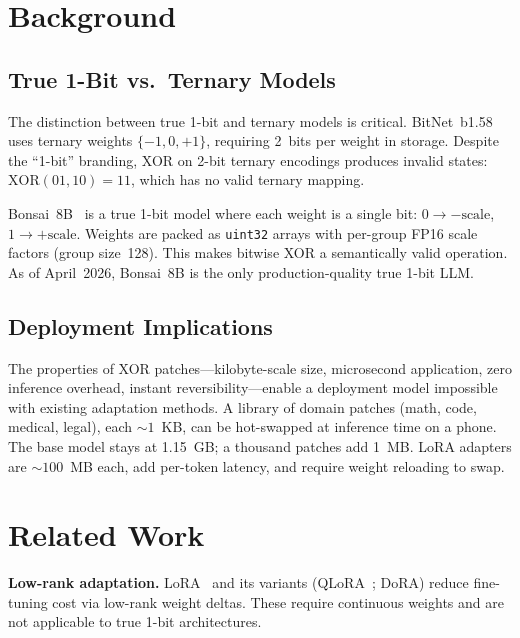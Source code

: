 \documentclass[11pt,a4paper]{article}
\begin{document}
\section{Background}

\subsection{True 1-Bit vs.\ Ternary Models}

The distinction between true 1-bit and ternary models is critical.
BitNet~b1.58~\citep{wang2023bitnet,ma2025bitnet} uses ternary weights
$\{-1, 0, +1\}$, requiring 2~bits per weight in storage. Despite the
``1-bit'' branding, XOR on 2-bit ternary encodings produces invalid
states: $\text{XOR}(01, 10) = 11$, which has no valid ternary mapping.

Bonsai~8B~\citep{prismml2026} is a true 1-bit model where each weight
is a single bit: $0 \to -\text{scale}$, $1 \to +\text{scale}$. Weights
are packed as \texttt{uint32} arrays with per-group FP16 scale factors
(group size~128). This makes bitwise XOR a semantically valid operation.
As of April~2026, Bonsai~8B is the only production-quality true 1-bit LLM.

\subsection{Deployment Implications}

The properties of XOR patches---kilobyte-scale size, microsecond
application, zero inference overhead, instant reversibility---enable
a deployment model impossible with existing adaptation methods.
A library of domain patches (math, code, medical, legal), each
${\sim}1$~KB, can be hot-swapped at inference time on a phone.
The base model stays at 1.15~GB; a thousand patches add 1~MB.
LoRA adapters are ${\sim}100$~MB each, add per-token latency,
and require weight reloading to swap.

\section{Related Work}

\textbf{Low-rank adaptation.}
LoRA~\citep{hu2021lora} and its variants (QLoRA~\citep{dettmers2023qlora};
DoRA) reduce fine-tuning cost via low-rank weight deltas. These require
continuous weights and are not applicable to true 1-bit architectures.
\end{document}
